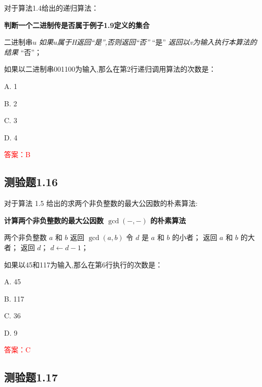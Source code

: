 \documentclass[UTF8, heading=true]{ctexart}
\begin{document}
对于算法1.4给出的递归算法：

\begin{algorithm}
    \caption{\textbf{判断一个二进制传是否属于例子1.9定义的集合}}
    \begin{algorithmic}[1]
        \Require 二进制串$u$
        \Ensure \textit{如果$u$属于H返回“是”,否则返回“否”}
        \State \Return “是”
        \EndIf
        \State \textit{返回以v为输入执行本算法的结果}
        \Else 
        \State \Return “否”；
        \EndIf
    \end{algorithmic}
\end{algorithm}

如果以二进制串001100为输入,那么在第2行递归调用算法的次数是：

A. 1

B. 2

C. 3

D. 4

\textcolor{red}{答案：B}

\subsection{测验题1.16}

对于算法 1.5 给出的求两个非负整数的最大公因数的朴素算法:

\begin{algorithm}
  \caption{\textbf{计算两个非负整数的最大公因数 $\operatorname{gcd}(-,-)$ 的朴素算法}}
  \begin{algorithmic}[1]
    \Require 两个非负整数 $a$ 和 $b$
    \Ensure 返回 $\operatorname{gcd}(a, b)$
    \State 令 $d$ 是 $a$ 和 $b$ 的小者；
    \State 返回 $a$ 和 $b$ 的大者；
    \EndIf
    \State 返回 $d$；
    \EndIf
    \State $d \gets d-1$；
    \EndWhile
  \end{algorithmic}
\end{algorithm}

如果以45和117为输入,那么在第6行执行的次数是：

A. 45

B. 117

C. 36

D. 9




\textcolor{red}{答案：C}

\subsection{测验题1.17}
\end{document}
